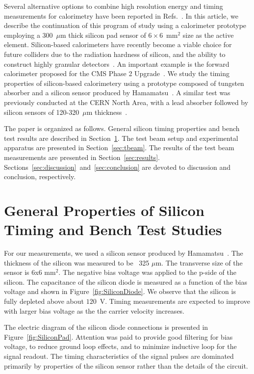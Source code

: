 \documentclass[preprint,1p]{elsarticle}
\begin{document}
Several alternative options to combine high resolution energy and timing
measurements for calorimetry have been reported in Refs.~\cite{Anderson:2015gha,
MCPFastCaloNIMA, Ronzhin2015288, Ronzhin201552, Brianza2015216}. In this
article, we describe the continuation of this program of study using a
calorimeter prototype employing a 300~$\mu$m thick silicon pad sensor of
$6\times 6$~mm$^2$ size as the active element. Silicon-based calorimeters have
recently become a viable choice for future colliders due to the radiation
hardness of silicon, and the ability to construct highly granular
detectors~\cite{Adloff:2011ha}. An important example is the forward calorimeter
proposed for the CMS Phase 2 Upgrade~\cite{Butler:2020886}. We study the timing
properties of silicon-based calorimetery using a prototype composed of tungsten
absorber and a silicon sensor produced by Hamamatsu~\cite{hamamatsu}. A similar
test was previously conducted at the CERN North Area, with a lead
absorber followed by silicon sensors of 120-320~$\mu$m thickness~\cite{akchurin}.

The paper is organized as follows. General silicon timing properties and bench
test results are described in Section~\ref{sec:siliconpad}. The test beam setup
and experimental apparatus are presented in Section~\ref{sec:tbeam}. The results
of the test beam measurements are presented in Section~\ref{sec:results}.
Sections~\ref{sec:discussion}~and~\ref{sec:conclusion} are devoted to discussion
and conclusion, respectively.

\section{General Properties of Silicon Timing and Bench Test Studies}
\label{sec:siliconpad}

For our measurements, we used a silicon sensor produced by
Hamamatsu~\cite{hamamatsu}. The thickness of the silicon was measured to be ~325
$\mu$m. The transverse size of the sensor is 6x6 mm$^2$. The negative bias
voltage was applied to the p-side of the silicon. The capacitance
of the silicon diode is measured as a function of the bias voltage
and shown in Figure~\ref{fig:SiliconDiode}. We observe that the silicon
is fully depleted above about $120$~V. Timing measurements are expected
to improve with larger bias voltage as the the carrier velocity increases.

The electric diagram of the silicon
diode connections is presented in Figure~\ref{fig:SiliconPad}. Attention was
paid to provide good filtering for bias voltage, to reduce ground loop effects, and
to minimize inductive loop for the signal readout. The timing characteristics
of the signal pulses are dominated primarily by properties of the
silicon sensor rather than the details of the circuit.
\end{document}
